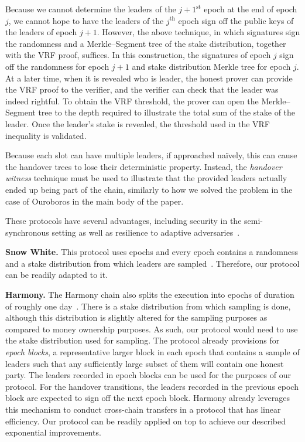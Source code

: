 Because we cannot determine the leaders of the $j+1^\text{st}$ epoch at the end of epoch
$j$, we cannot hope to have the leaders of the $j^\text{th}$ epoch sign off the public
keys of the leaders of epoch $j+1$. However, the above technique,
in which signatures sign the randomness
and a Merkle--Segment tree of the stake distribution, together with the VRF proof, suffices.
In this construction, the signatures of epoch $j$ sign off the randomness for epoch $j+1$ and stake
distribution Merkle tree for epoch $j$. At a later time, when it is revealed who is leader,
the honest prover can provide the VRF proof to the verifier, and the verifier can check
that the leader was indeed rightful. To obtain the VRF threshold, the prover can open the
Merkle--Segment tree to the depth required to illustrate the total sum of the stake of the leader.
Once the leader's stake is revealed, the threshold used in the VRF inequality is validated.

Because each slot can have multiple leaders,
if approached na\"ively, this can cause the handover trees
to lose their deterministic property. Instead, the \emph{handover witness} technique must be
used to illustrate that the provided leaders actually ended up being part of the chain, similarly to
how we solved the problem in the case of Ouroboros in the main body of the paper.

These protocols have several advantages, including security in the semi-synchronous
setting as well as resilience to adaptive adversaries~\cite{praos,genesis}.

\noindent
\textbf{Snow White.}
This protocol uses epochs and every epoch contains a randomness and a
stake distribution from which leaders are sampled~\cite{snowwhite}.
Therefore, our protocol can be readily
adapted to it.

\noindent
\textbf{Harmony.}
The Harmony chain also splits the execution into epochs of duration of roughly one
day~\cite{harmony}.
There is a stake distribution from which sampling is done, although this distribution
is slightly altered for the sampling purposes as compared to money ownership purposes.
As such, our protocol would need to use the stake distribution used for sampling.
The protocol already provisions for \emph{epoch blocks}, a representative larger block
in each epoch that contains a sample of leaders such that any sufficiently large subset
of them will contain one honest party. The leaders recorded in epoch blocks can be used
for the purposes of our protocol. For the handover transitions, the leaders recorded in
the previous epoch block are expected to sign off the next epoch block. Harmony already
leverages this mechanism to conduct cross-chain transfers in a protocol that has
linear efficiency. Our protocol can be readily applied on top to achieve our described
exponential improvements.

